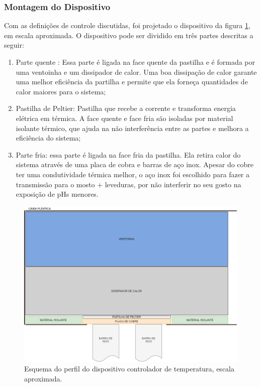 \subsubsection{Montagem do Dispositivo}

Com as definições de controle discutidas, foi projetado o dispositivo da figura \ref{fig:dispositivo_term}, em escala aproximada. O dispositivo pode ser dividido em três partes descritas a seguir:

\begin{enumerate}
    \item Parte quente : Essa parte é ligada na face quente da pastilha e é formada por uma ventoinha e um dissipador de calor. Uma boa dissipação de calor garante uma melhor eficiência da partilha e permite que ela forneça quantidades de calor maiores para o sistema;
    \item Pastilha de Peltier: Pastilha que recebe a corrente e transforma energia elétrica em térmica. A face quente e face fria são isoladas por material isolante térmico, que ajuda na não interferência entre as partes e melhora a eficiência do sistema;
    \item Parte fria: essa parte é ligada na face fria da pastilha. Ela retira calor do sistema através de uma placa de cobra e barras de aço inox. Apesar do cobre ter uma condutividade térmica melhor, o aço inox foi escolhido para fazer a transmissão para o mosto + leveduras, por não interferir no seu gosto na exposição de pHs menores. 
\end{enumerate}


\begin{figure}[H]
    \centering
    \includegraphics[scale=0.45]{figuras/implementacao/hardware/montagem.png}
    \caption{Esquema do perfil do dispositivo controlador de temperatura, escala aproximada.}
    \label{fig:dispositivo_term}
\end{figure}
